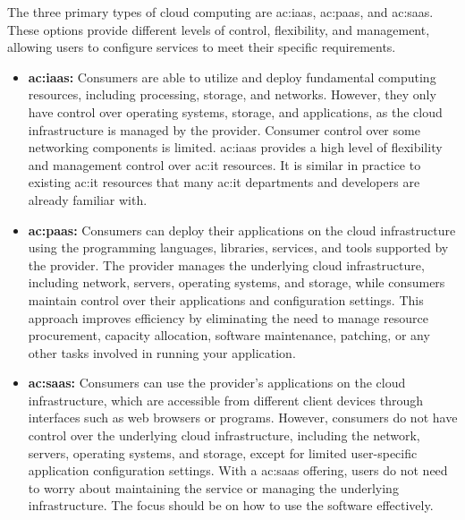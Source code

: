 The three primary types of cloud computing are \gls{ac:iaas}, \gls{ac:paas}, and \gls{ac:saas}. These options provide different levels of control, flexibility, and management, allowing users to configure services to meet their specific requirements.
\begin{itemize}
    \item \textbf{\gls{ac:iaas}:} Consumers are able to utilize and deploy fundamental computing resources, including processing, storage, and networks. However, they only have control over operating systems, storage, and applications, as the cloud infrastructure is managed by the provider. Consumer control over some networking components is limited. \gls{ac:iaas} provides a high level of flexibility and management control over \gls{ac:it} resources. It is similar in practice to existing \gls{ac:it} resources that many \gls{ac:it} departments and developers are already familiar with. 
    \item \textbf{\gls{ac:paas}:} Consumers can deploy their applications on the cloud infrastructure using the programming languages, libraries, services, and tools supported by the provider. The provider manages the underlying cloud infrastructure, including network, servers, operating systems, and storage, while consumers maintain control over their applications and configuration settings. This approach improves efficiency by eliminating the need to manage resource procurement, capacity allocation, software maintenance, patching, or any other tasks involved in running your application. 
    \item \textbf{\gls{ac:saas}:} Consumers can use the provider's applications on the cloud infrastructure, which are accessible from different client devices through interfaces such as web browsers or programs. However, consumers do not have control over the underlying cloud infrastructure, including the network, servers, operating systems, and storage, except for limited user-specific application configuration settings. With a \gls{ac:saas} offering, users do not need to worry about maintaining the service or managing the underlying infrastructure. The focus should be on how to use the software effectively.
\end{itemize}

